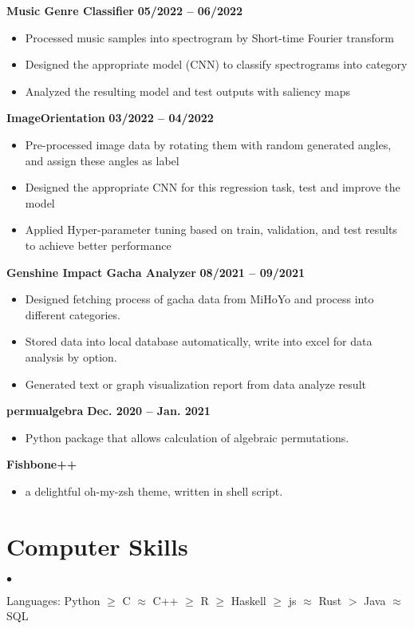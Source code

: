 \documentclass[margin,line]{res}
\newenvironment{list2}{
  \begin{list}{$\bullet$}{%
      \setlength{\itemsep}{0in}
      \setlength{\parsep}{0in} \setlength{\parskip}{0in}
      \setlength{\topsep}{0in} \setlength{\partopsep}{0in} 
      \setlength{\leftmargin}{0.2in}}}{\end{list}}
\begin{document}
\begin{resume}
{\bf Music Genre Classifier} \hfill {\bf 05/2022 -- 06/2022} \\
\begin{itemize}
	\item Processed music samples into spectrogram by Short-time Fourier transform
	\item Designed the appropriate model (CNN) to classify spectrograms into category
	\item Analyzed the resulting model and test outputs with saliency maps
\end{itemize}
\vspace{-.3cm}

{\bf ImageOrientation} \hfill {\bf 03/2022 -- 04/2022} \\
\begin{itemize}
	\item Pre-processed image data by rotating them with random generated angles, and assign these angles as label
	\item Designed the appropriate CNN for this regression task, test and improve the model
	\item Applied Hyper-parameter tuning based on train, validation, and test results to achieve better performance
\end{itemize}
\vspace{-.3cm}

{\bf Genshine Impact Gacha Analyzer} \hfill {\bf 08/2021 -- 09/2021} \\
\begin{itemize}
	\item Designed fetching process of gacha data from MiHoYo and process into different categories.
	\item Stored data into local database automatically, write into excel for data analysis by option.
	\item Generated text or graph visualization report from data analyze result
\end{itemize}
\vspace{-.3cm}


{\bf permualgebra} \hfill {\bf Dec. 2020 -- Jan. 2021} \\
\begin{itemize}
  \item Python package that allows calculation of algebraic permutations.
\end{itemize}
\vspace{-.3cm}

{\bf Fishbone++} \\
\begin{itemize}
  \item a delightful oh-my-zsh theme, written in shell script.
\end{itemize}



\section{\sc Computer Skills} 
\begin{list2}
\item Languages: Python $\geq$ C $\approx$ C++ $\geq$ R $\geq$ Haskell $\geq$ js $\approx$ Rust $>$ Java $\approx$ SQL
\end{list2}



\end{resume}
\end{document}
